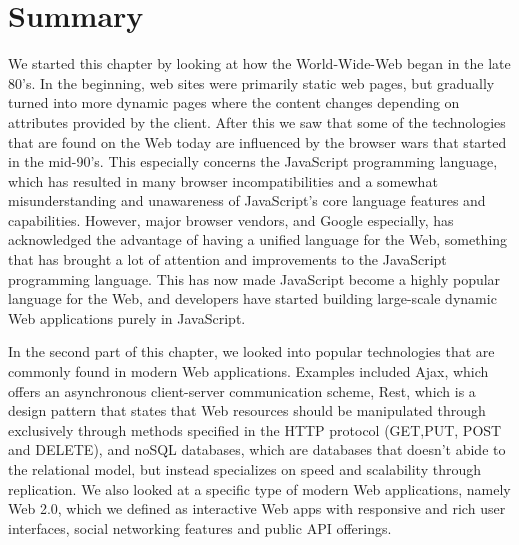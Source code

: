 \section{Summary}
We started this chapter by looking at how the World-Wide-Web began in the late 80's. In the beginning, web sites were primarily static web pages, but gradually turned into more dynamic pages where the content changes depending on attributes provided by the client. After this we saw that some of the technologies that are found on the Web today are influenced by the browser wars that started in the mid-90's. This especially concerns the JavaScript programming language, which has resulted in many browser incompatibilities and a somewhat misunderstanding and unawareness of JavaScript's core language features and capabilities. However, major browser vendors, and Google especially, has acknowledged the advantage of having a unified language for the Web, something that has brought a lot of attention and improvements to the JavaScript programming language. This has now made JavaScript become a highly popular language for the Web, and developers have started building large-scale dynamic Web applications purely in JavaScript.

In the second part of this chapter, we looked into popular technologies that are commonly found in modern Web applications. Examples included Ajax, which offers an asynchronous client-server communication scheme, Rest, which is a design pattern that states that Web resources should be manipulated through exclusively through methods specified in the HTTP protocol (GET,PUT, POST and DELETE), and noSQL databases, which are databases that doesn't abide to the relational model, but instead specializes on speed and scalability through replication. We also looked at a specific type of modern Web applications, namely Web 2.0, which we defined as interactive Web apps with responsive and rich user interfaces, social networking features and public API offerings.   
